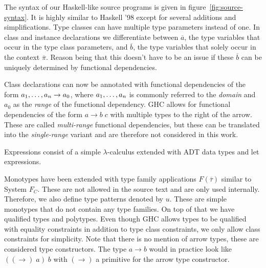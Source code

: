 The syntax of our Haskell-like source programs is given in
figure~\ref{fig:source-syntax}. It is highly similar to Haskell '98 except for
several additions and simplifications. Type classes can have
multiple type parameters instead of one. In class and instance declarations we
differentiate between $\overline{a}$, the type variables that occur in the type
class parameters, and $\overline{b}$, the type variables that solely occur in the
context $\overline{\pi}$. Reason being that this doesn't have to be an issue if
these $\overline{b}$ can be uniquely determined by functional dependencies.

Class declarations can now be annotated with functional dependencies of the form
$a_1, \mathellipsis, a_n \rightarrow a_0$, where $a_1, \mathellipsis, a_n$ is
commonly referred to the \textit{domain} and $a_0$ as the \textit{range} of the
functional dependency. GHC allows for functional dependencies of the form $a
\rightarrow b \; c$ with multiple types to the right of the arrow. These are
called \textit{multi-range} functional dependencies, but these can be translated
into the \textit{single-range} variant \cite{fundeps-chrs} and are therefore not
considered in this work.

Expressions consist of a simple $\lambda$-calculus extended with ADT data types
and let expressions.

Monotypes have been extended with type family applications $F(\overline{\tau})$
\cite{associated-types-with-class} similar to System $F_C$. These are not
allowed in the source text and are only used internally. Therefore, we also
define type patterns denoted by $u$. These are simple monotypes that do not
contain any type families. On top of that we have qualified types and polytypes.
Even though GHC allows types to be qualified with equality constraints in
addition to type class constraints, we only allow class constraints for
simplicity. Note that there is no mention of arrow types, these are considered
type constructors. The type $a \rightarrow b$ would in practice look like
$((\rightarrow) \; a) \; b$ with $(\rightarrow)$ a primitive for the arrow type
constructor.


